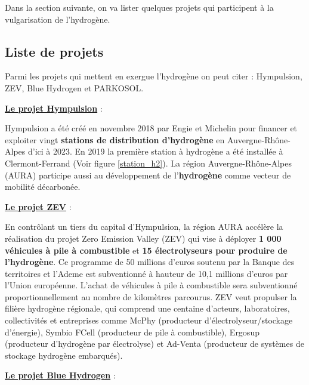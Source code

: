  Dans la section suivante, on va lister quelques projets qui participent à la vulgarisation de l'hydrogène.
 \subsection{Liste de projets}

Parmi les projets qui mettent en exergue l'hydrogène on peut citer : Hympulsion, ZEV, Blue Hydrogen et PARKOSOL.%

\underline{\textbf{Le projet Hympulsion}} :

Hympulsion a été créé en novembre 2018 par Engie et Michelin pour financer et exploiter vingt \textbf{stations de distribution d'hydrogène} en Auvergne-Rhône-Alpes d'ici à 2023. En 2019 la première station à hydrogène a été installée à Clermont-Ferrand (Voir figure \ref{station_h2}). La région Auvergne-Rhône-Alpes (AURA) participe aussi au développement de l'\textbf{hydrogène} comme vecteur de mobilité décarbonée.

\underline{\textbf{Le projet ZEV}} :

En contrôlant un tiers du capital d'Hympulsion, la région AURA accélère la réalisation du projet Zero Emission Valley (ZEV) qui vise à déployer \textbf{1 000 véhicules à pile à combustible} et \textbf{15 électrolyseurs pour produire de l'hydrogène}.
Ce programme de 50 millions d'euros soutenu par la Banque des territoires et l'Ademe est subventionné à hauteur de 10,1 millions d'euros par l'Union européenne. 
L'achat de véhicules à pile à combustible sera subventionné proportionnellement au nombre de kilomètres parcourus. ZEV veut propulser la filière hydrogène régionale, qui comprend une centaine d'acteurs, laboratoires, collectivités et entreprises comme McPhy (producteur d'électrolyseur/stockage d'énergie), Symbio FCell (producteur de pile à combustible), Ergosup (producteur d'hydrogène par électrolyse) et Ad-Venta (producteur de systèmes de stockage hydrogène embarqués).


\underline{\textbf{Le projet Blue Hydrogen}} :

